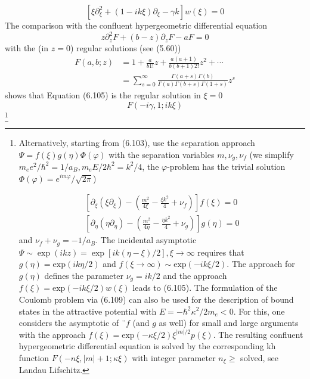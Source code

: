 \begin{equation}
    \left[\xi \partial_{\xi}^{2}+(1-i k \xi) \partial_{\xi}-\gamma k\right] w(\xi)=0
    \end{equation}
The comparison with the confluent hypergeometric differential equation
\begin{equation}
    z \partial_{z}^{2} F+(b-z) \partial_{z} F-a F=0
    \end{equation}
with the (in $z = 0$) regular solutions (see (5.60))
\begin{equation}
\begin{aligned} F(a, b ; z) &=1+\frac{a}{b 1 !} z+\frac{a(a+1)}{b(b+1) 2 !} z^{2}+\cdots \\ &=\sum_{s=0}^{\infty} \frac{\Gamma(a+s) \Gamma(b)}{\Gamma(a) \Gamma(b+s) \Gamma(1+s)} z^{s} \end{aligned}
\end{equation}
shows that Equation (6.105) is the regular solution in $\xi = 0$
\begin{equation}
    F(-i \gamma, 1 ; i k \xi)
    \end{equation}
\footnote{Alternatively, starting from (6.103), use the separation approach $\Psi=f(\xi)g(\eta)\Phi(\varphi)$ with the separation variables $m, ν_g, ν_f$ (we simplify$ m_ee^2/\hbar^2=1/a_B,m_eE/2\hbar^2=k^2 / 4$, the $\varphi$-problem has the trivial solution $\Phi(\varphi)=e^{im\varphi}/\sqrt{2\pi}$) 

\begin{equation}
\begin{array}{l}{\left[\partial_{\xi}\left(\xi \partial_{\xi}\right)-\left(\frac{m^{2}}{4 \xi}-\frac{\xi k^{2}}{4}+\nu_{f}\right)\right] f(\xi)=0} \\ {\left[\partial_{\eta}\left(\eta \partial_{\eta}\right)-\left(\frac{m^{2}}{4 \eta}-\frac{\eta k^{2}}{4}+\nu_{g}\right)\right] g(\eta)=0}\end{array}
\end{equation}
and $ν_f + ν_g = -1 / a_B$. The incidental asymptotic $\Psi\sim \operatorname{exp}(ikz)=\operatorname{exp}[ik(\eta-\xi)/2],\xi\rightarrow\infty$ requires that $g (\eta) = \text{exp} (ik\eta / 2)$ and $f (\xi\rightarrow\infty) \sim \text{exp} (- ik\xi / 2)$. The approach for $g (\eta)$ defines the parameter $ν_g = ik / 2$ and the approach $f (\xi) = \text{exp} (-ik\xi / 2) w (\xi)$ leads to (6.105). The formulation of the Coulomb problem via (6.109) can also be used for the description of bound states in the attractive potential with $E = - \hbar^2\kappa^2 / 2m_e <0$. For this, one considers the asymptotic of $¨f$ (and $g$ as well) for small and large arguments with the approach $f (\xi) = \text{exp} (-\kappa\xi / 2) \xi^{| m | / 2} p (\xi)$. The resulting confluent hypergeometric differential equation is solved by the corresponding kh function $F (-n\xi, ​​| m | + 1; \kappa\xi)$ with integer parameter $n_{\xi}\geq$ solved, see Landau Lifschitz.}
